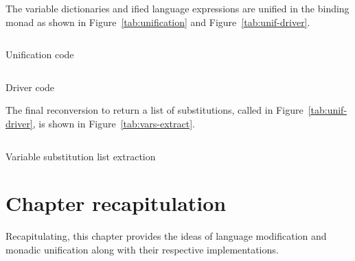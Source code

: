 \documentclass[thesis-solanki.tex]{subfiles}
\begin{document}
The variable dictionaries and ified language expressions are unified in the binding monad
as shown in Figure~\ref{tab:unification} and Figure~\ref{tab:unif-driver}.
%
\begin{code-list}
  \begin{singlespace}
    \inputminted[linenos]{haskell}{haskell-proto1-unify-monad.hs}
  \end{singlespace}
  \caption{Unification code}
  \label{tab:unification}
\end{code-list}

\begin{code-list}[H]
  \begin{singlespace}
    \inputminted[linenos]{haskell}{haskell-proto1-unify-driver.hs}
  \end{singlespace}
  \caption{Driver code}
  \label{tab:unif-driver}
\end{code-list}


The final reconversion to return a list of substitutions, called  in
Figure~\ref{tab:unif-driver}, is shown in Figure~\ref{tab:vars-extract}.
\begin{code-list}[H]
  \begin{singlespace}
    \inputminted[linenos]{haskell}{haskell-proto1-unify-out.hs}
  \end{singlespace}
  \caption{Variable substitution list extraction}
  \label{tab:vars-extract}
\end{code-list}

\section{Chapter recapitulation}
Recapitulating, this chapter provides the ideas of language modification and monadic unification along with their
respective implementations.


\ifMain\ifDraft
\begin{scope}
  \nolinenumbers
  \enotesize
  \par
  \begin{singlespace}
  \setlength{\parskip}{12pt plus 2pt minus 1pt}
  \theendnotes
  \par
  \end{singlespace}
\end{scope}
\fi\fi
\end{document}
